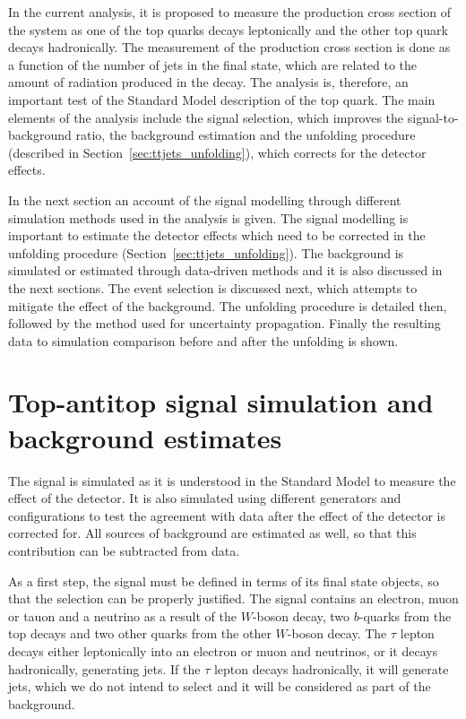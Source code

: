 In the current analysis, it is proposed to measure the production cross section of the \ttbar system as one of the top quarks decays leptonically and the other top quark
decays hadronically. The measurement of the production cross section is done as a function of the number of jets in the final state, which are
related to the amount of radiation produced in the \ttbar decay. The analysis is, therefore, an important test of the Standard Model description of the top quark.
The main elements of the analysis include the signal selection, which improves the signal-to-background ratio, the background estimation
and the unfolding procedure (described in Section~\ref{sec:ttjets_unfolding}), which corrects for the detector effects.

In the next section an account of the signal modelling through different simulation
methods used in the analysis is given.
The signal modelling is important to estimate the detector effects which need to be corrected in the unfolding procedure (Section~\ref{sec:ttjets_unfolding}).
The background is simulated or estimated through data-driven methods and it is also discussed in the next sections.
The event selection is discussed next, which attempts to mitigate the effect of the background.
The unfolding procedure is detailed then, followed by the method used for uncertainty propagation.
Finally the resulting data to simulation comparison before and after the unfolding is shown.

\section{Top-antitop signal simulation and background estimates}
\label{sec:ttjets_background}

The signal is simulated as it
is understood in the Standard Model to measure the effect of the detector. It is also simulated using different generators
and configurations to test the agreement with data after the effect of the detector is corrected for.
All sources of background are estimated as well, so that this contribution can be subtracted from data.

As a first step, the signal must be
defined in terms of its final state objects, so that the selection can be properly justified.
The signal contains an electron, muon or tauon and a neutrino as a result of the $W$-boson decay, two $b$-quarks
from the top decays and two other quarks from the other $W$-boson decay.
The $\tau$ lepton decays either leptonically into an electron or muon and neutrinos,
or it decays hadronically, generating jets. If the $\tau$
lepton decays hadronically, it will generate jets, which we do not intend to select and it will be considered as part of the background.

